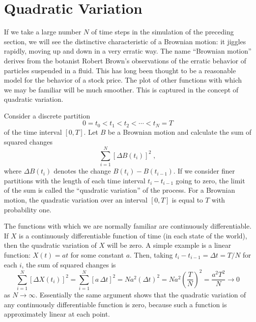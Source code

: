 \section{Quadratic Variation}\label{s_quadraticvariation}
If we take a large number $N$ of time steps in the simulation of the preceding section, we will see the distinctive characteristic of a Brownian motion: it jiggles rapidly, moving up and down in a very erratic way.  The name ``Brownian motion'' derives from the botanist Robert Brown's observations of the erratic behavior of particles suspended in a fluid.  This has long been thought to be a reasonable model for the behavior of a stock price.   
The plot of other functions with which we may be familiar will be much smoother.  This is captured in the concept of quadratic variation.  

Consider a discrete partition 
$$0=t_0 < t_1 < t_2 < \cdots < t_N=T$$
of the time interval $[0,T]$.  Let $B$ be a Brownian motion and calculate the sum of squared changes
$$\sum_{i=1}^N [\varDelta B(t_i)]^2\; ,$$
where $\varDelta B(t_i)$ denotes the change $B(t_i)-B(t_{i-1}).$  If we consider finer partitions with the length of each time interval $t_i-t_{i-1}$ going to zero, the limit of the sum is called the ``quadratic variation'' of the process.   For a Brownian motion, the quadratic variation over an interval $[0,T]$ is equal to $T$ with probability one.  

The functions with which we are normally familiar are continuously differentiable.  If $X$ is a continuously differentiable function of time (in each state of the world), then the quadratic variation of $X$ will be zero.  A simple example is a linear function: $X(t) = at$ for some constant $a$.  Then, taking $t_i-t_{i-1} = \varDelta t = T/N$ for each $i$, the sum of squared changes is
$$\sum_{i=1}^N [\varDelta X(t_i)]^2 = \sum_{i=1}^N  [a\,\varDelta t]^2 = Na^2 (\varDelta t)^2 = Na^2 \left(\frac{T}{N}\right)^2 = \frac{a^2T^2}{N} \rightarrow 0$$
as $N \rightarrow \infty$.  Essentially the same argument shows that the quadratic variation of any continuously differentiable function is zero, because such a function is approximately linear at each point.

